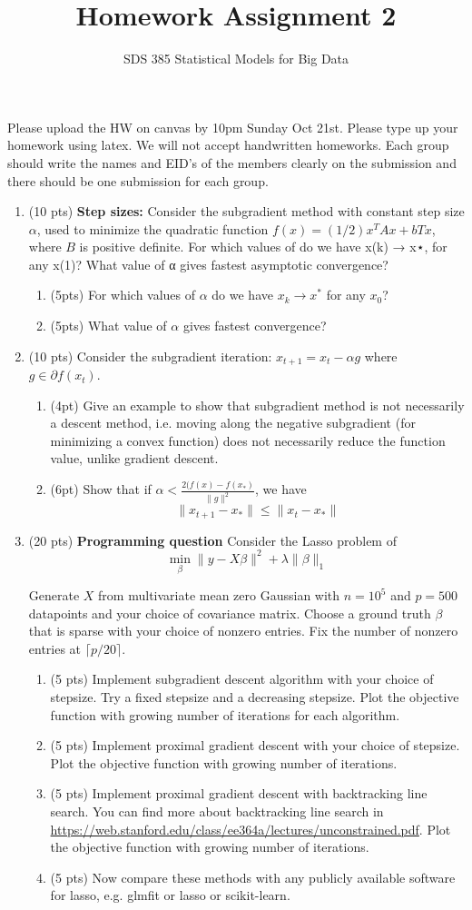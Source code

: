 \documentclass[11pt]{article}
\newcommand{\bi}{\begin{enumerate}}
\newcommand{\ib}{\end{enumerate}}
\newcommand{\p}{\item}
\begin{document}
\title{{\bf Homework Assignment 2}}
\author{SDS 385 Statistical Models for Big Data}

\date{}

\maketitle{}
Please upload the HW on canvas by 10pm Sunday Oct 21st. Please type up your homework using latex. We will not accept handwritten homeworks. Each group should write the names and EID's of the members clearly on the submission and there should be one submission for each group. 
\begin{enumerate}%
\item (10 pts) \textbf{Step sizes: } Consider the subgradient method with constant step size $\alpha$, used to minimize the quadratic function $f (x) = (1/2)x^T A x + bT x$, where $B$ is positive definite. For which values of  do we have x(k) → x⋆, for any x(1)? What value of α gives fastest asymptotic convergence?
\bi
\p (5pts) For which values of $\alpha$ do we have $x_k \rightarrow x^*$ for any $x_0$?
\p (5pts) What value of $\alpha$ gives fastest convergence?
\ib
\p (10 pts) Consider the subgradient iteration: $x_{t+1}=x_t-\alpha g$ where $g\in\partial f(x_t)$.
\bi
\p (4pt) Give an example to show that subgradient method is not necessarily a descent method, i.e. moving along the negative subgradient (for minimizing a convex function) does not necessarily reduce the function value, unlike gradient descent.
\p (6pt) Show that if $\alpha< \frac{2(f(x)-f(x_*)}{\|g\|^2}$, we have  $$\|x_{t+1}-x_*\|\leq \|x_t-x_*\|$$
\ib


\item (20 pts) \textbf{Programming question} Consider the Lasso problem of
$$\min_\beta \|y-X\beta\|^2+\lambda\|\beta\|_1$$

Generate $X$ from multivariate mean zero Gaussian with $n=10^5$ and $p=500$ datapoints and your choice of covariance matrix. Choose a ground truth $\beta$ that is sparse with your choice of nonzero entries. Fix the number of nonzero entries at $\lceil p/20 \rceil $.

\bi
\p (5 pts) Implement subgradient descent algorithm with your choice of stepsize. Try a fixed stepsize and a decreasing stepsize. Plot the objective function with growing number of iterations for each algorithm.
\p (5 pts) Implement proximal gradient descent with your choice of stepsize. Plot the objective function with growing number of iterations.
\p (5 pts) Implement proximal gradient descent with backtracking line search. You can find more about backtracking line search in \url{https://web.stanford.edu/class/ee364a/lectures/unconstrained.pdf}. Plot the objective function with growing number of iterations.
\p (5 pts) Now compare these methods with any publicly available software for lasso, e.g. glmfit or lasso or scikit-learn.
\ib
\end{enumerate}
\end{document}

